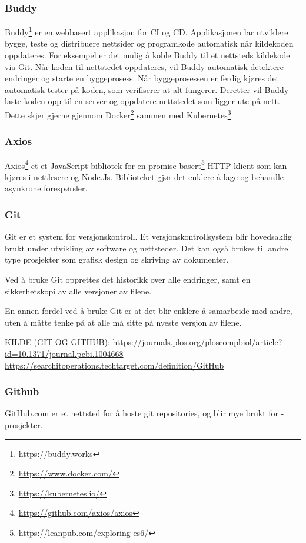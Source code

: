 \subsubsection{Buddy}
Buddy\footnote{\url{https://buddy.works}} er en webbasert applikasjon for CI og CD. Applikasjonen lar utviklere bygge, teste og distribuere nettsider og programkode automatisk når kildekoden oppdateres. For eksempel er det mulig å koble Buddy til et nettsteds kildekode via Git. Når koden til nettstedet oppdateres, vil Buddy automatisk detektere endringer og starte en byggeprosess. Når byggeprosessen er ferdig kjøres det automatisk tester på koden, som verifiserer at alt fungerer. Deretter vil Buddy laste koden opp til en server og oppdatere nettstedet som ligger ute på nett. Dette skjer gjerne gjennom Docker\footnote{\url{https://www.docker.com/}} sammen med Kubernetes\footnote{\url{https://kubernetes.io/}}.

\subsubsection{Axios}
Axios\footnote{\url{https://github.com/axios/axios}} et et JavaScript-bibliotek for en promise-basert\footnote{\url{https://leanpub.com/exploring-es6/}} HTTP-klient som kan kjøres i nettlesere og Node.Js. Biblioteket gjør det enklere å lage og behandle asynkrone forespørsler.

\subsubsection{Git}
Git er et system for versjonskontroll. Et versjonskontrollsystem blir hovedsaklig brukt under utvikling av software og nettsteder. Det kan også brukes til andre type prosjekter som grafisk design og skriving av dokumenter.

Ved å bruke Git opprettes det historikk over alle endringer, samt en sikkerhetskopi av alle versjoner av filene.

En annen fordel ved å bruke Git er at det blir enklere å samarbeide med andre, uten å måtte tenke på at alle må sitte på nyeste versjon av filene.

KILDE (GIT OG GITHUB): \url{https://journals.plos.org/ploscompbiol/article?id=10.1371/journal.pcbi.1004668}
\url{https://searchitoperations.techtarget.com/definition/GitHub}

\subsubsection{Github}
GitHub.com er et nettsted for å hoste git repositories, og blir mye brukt for -prosjekter. 


